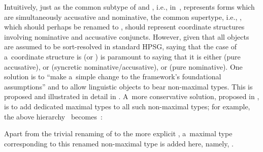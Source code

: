 \documentclass[output=paper]{langsci/langscibook}
\begin{document}
Intuitively, just as the common subtype of  and , i.e.,  in~, represents forms which are simultaneously accusative and nominative, the common supertype, i.e., , which should perhaps be renamed to , should represent coordinate structures involving nominative and accusative conjuncts.  However, given that all objects are assumed to be sort-resolved in standard HPSG, saying that the case of a~coordinate structure is  (or ) is paramount to saying that it is either  (pure accusative), or  (syncretic nominative/accusative), or  (pure nominative).  One solution is to “make a~simple change to the framework's foundational assumptions” \citep[268]{sag:02} and to allow linguistic objects to bear non-maximal types.  This is proposed and illustrated in detail in \citealt{sag:02}.  A~more conservative solution, proposed in \citealt{dani:01}, is to add dedicated maximal types to all such non-maximal types; for example, the above hierarchy~ becomes~:
\begin{examples}
\item\label{daniels20} 
\end{examples}
Apart from the trivial renaming of  to the more explicit , a~maximal type corresponding to this renamed non-maximal type is added here, namely, .
\end{document}
